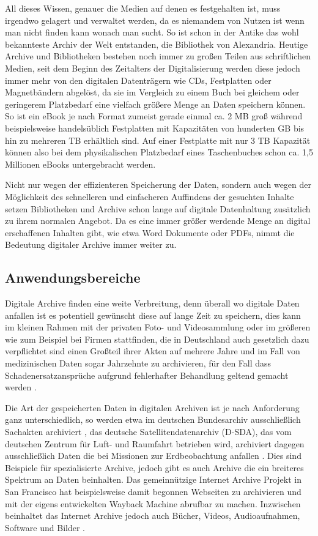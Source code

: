 \documentclass[conference,compsoc,final,a4paper]{IEEEtran}
\begin{document}
All dieses Wissen, genauer die Medien auf denen es festgehalten ist, muss irgendwo gelagert und verwaltet werden, da es niemandem von Nutzen ist wenn man nicht finden kann wonach man sucht. So ist schon in der Antike das wohl bekannteste Archiv der Welt entstanden, die Bibliothek von Alexandria. Heutige Archive und Bibliotheken bestehen noch immer zu großen Teilen aus schriftlichen Medien, seit dem Beginn des Zeitalters der Digitalisierung werden diese jedoch immer mehr von den digitalen Datenträgern wie CDs, Festplatten oder Magnetbändern abgelöst, da sie im Vergleich zu einem Buch bei gleichem oder geringerem Platzbedarf eine vielfach größere Menge an Daten speichern können. So ist ein eBook je nach Format zumeist gerade einmal ca. 2 \ac{MB} groß während beispielsweise handelsüblich Festplatten mit Kapazitäten von hunderten \ac{GB} bis hin zu mehreren \ac{TB} erhältlich sind. Auf einer Festplatte mit nur 3 \ac{TB} Kapazität können also bei dem physikalischen Platzbedarf eines Taschenbuches schon ca. 1,5 Millionen eBooks untergebracht werden.

Nicht nur wegen der effizienteren Speicherung der Daten, sondern auch wegen der Möglichkeit des schnelleren und einfacheren Auffindens der gesuchten Inhalte setzen Bibliotheken und Archive schon lange auf digitale Datenhaltung zusätzlich zu ihrem normalen Angebot. Da es eine immer größer werdende Menge an digital erschaffenen Inhalten gibt, wie etwa Word Dokumente oder \acs{PDF}s, nimmt die Bedeutung digitaler Archive immer weiter zu.

\subsection{Anwendungsbereiche}
Digitale Archive finden eine weite Verbreitung, denn überall wo digitale Daten anfallen ist es potentiell gewünscht diese auf lange Zeit zu speichern, dies kann im kleinen Rahmen mit der privaten Foto- und Videosammlung oder im größeren wie zum Beispiel bei Firmen stattfinden, die in Deutschland auch gesetzlich dazu verpflichtet sind einen Großteil ihrer Akten auf mehrere Jahre \autocite{AO147} und im Fall von medizinischen Daten sogar Jahrzehnte zu archivieren, für den Fall dass Schadenersatzansprüche aufgrund fehlerhafter Behandlung geltend gemacht werden \autocite{BGB852}.

Die Art der gespeicherten Daten in digitalen Archiven ist je nach Anforderung ganz unterschiedlich, so werden etwa im deutschen Bundesarchiv ausschließlich Sachakten archiviert \autocite{Berger2005}, das deutsche Satellitendatenarchiv (\acs{D-SDA}), das vom deutschen Zentrum für Luft- und Raumfahrt betrieben wird, archiviert dagegen ausschließlich Daten die bei Missionen zur Erdbeobachtung anfallen \autocite{Memishi2019}. Dies sind Beispiele für spezialisierte Archive, jedoch gibt es auch Archive die ein breiteres Spektrum an Daten beinhalten. Das gemeinnützige Internet Archive Projekt in San Francisco hat beispielsweise damit begonnen Webseiten zu archivieren und mit der eigens entwickelten Wayback Machine abrufbar zu machen. Inzwischen beinhaltet das Internet Archive jedoch auch Bücher, Videos, Audioaufnahmen, Software und Bilder \autocite{AboutIA}.
\end{document}
